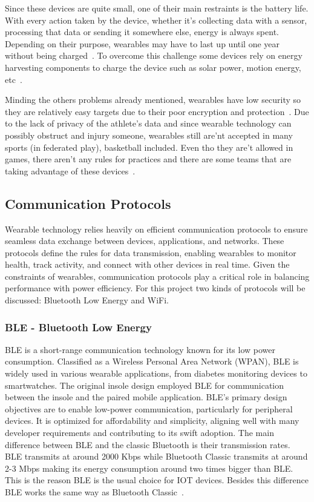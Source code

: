 Since these devices are quite small, one of their main restraints is the battery life. With every action taken by the device, whether it's collecting data with a sensor, processing that data or sending it 
somewhere else, energy is always spent. Depending on their purpose, wearables may have to last up until one year without being charged~\cite{challengesWearables}. To overcome this challenge 
some devices rely on energy harvesting components to charge the device such as solar power, motion energy, etc~\cite{embedding}.

Minding the others problems already mentioned, wearables have low security so they are relatively easy targets due to their poor encryption and protection~\cite{wearablesAndIOT}.
Due to the lack of privacy of the athlete's data and since wearable technology can possibly obstruct and injury someone, wearables still are'nt accepted in many sports 
(in federated play), basketball included. Even tho they are't allowed in games, there aren't any rules for practices and there are some teams that are taking advantage of these 
devices~\cite{NBPAWearables, hawksWear}.


\subsection{Communication Protocols} %
\label{ssec:communication_protocols}

Wearable technology relies heavily on efficient communication protocols to ensure seamless data exchange between devices, applications, and networks. These protocols define the rules 
for data transmission, enabling wearables to monitor health, track activity, and connect with other devices in real time. Given the constraints of wearables, communication protocols 
play a critical role in balancing performance with power efficiency.
For this project two kinds of protocols will be discussed: Bluetooth Low Energy and WiFi.


\subsubsection{BLE - Bluetooth Low Energy}
\label{sssec:bleT}

BLE is a short-range communication technology known for its low power consumption. Classified as a Wireless Personal Area Network (WPAN), BLE is widely used in 
various wearable applications, from diabetes monitoring devices to smartwatches. The original insole design employed BLE for communication between the insole and the paired mobile application.
BLE's primary design objectives are to enable low-power communication, particularly for peripheral devices. It is optimized for affordability and simplicity, aligning well with many 
developer requirements and contributing to its swift adoption.
The main difference between BLE and the classic Bluetooth is their transmission rates. BLE transmits at around 2000 Kbps while Bluetooth Classic transmits at around 2-3 Mbps making its energy consumption 
around two times bigger than BLE. This is the reason BLE is the usual choice for IOT devices. Besides this difference BLE works the same way as Bluetooth Classic~\cite{masterInsole, bachelorInsole}.

